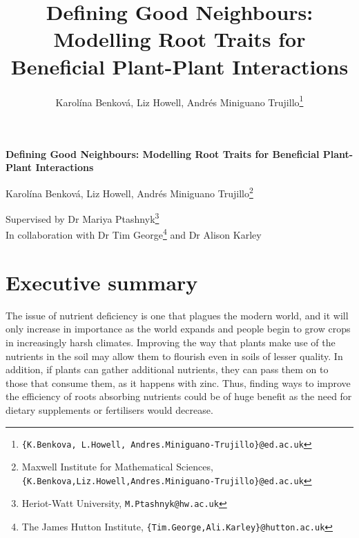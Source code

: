 \documentclass[11pt]{article}
\title{\bf
    \Large
    Defining Good Neighbours: Modelling Root Traits for Beneficial Plant-Plant Interactions
}
\author{
    Karolína Benková, Liz Howell, Andrés Miniguano Trujillo\footnote{ \texttt{\{K.Benkova, L.Howell, Andres.Miniguano-Trujillo\}@ed.ac.uk} }
}
\date{}
\numberwithin{equation}{section}
\begin{document}
\begin{titlepage}
    \begin{center}
        \vspace*{2cm}
        
        \Huge
        \textbf{Defining Good Neighbours: Modelling Root Traits for Beneficial Plant-Plant Interactions}
        
            
        \vspace{1cm}
        
        \Large Karolína Benková, Liz Howell, Andrés Miniguano Trujillo\footnote{\small Maxwell Institute for Mathematical Sciences,   \texttt{\{K.Benkova,Liz.Howell,Andres.Miniguano-Trujillo\}@ed.ac.uk}}
        
            
        \vspace{1.5cm}
            
        \Large
        Supervised by Dr Mariya Ptashnyk\footnote{\small Heriot-Watt University, \texttt{M.Ptashnyk@hw.ac.uk}} \\ 
        In collaboration with Dr Tim George\footnote{\small The James Hutton Institute, \texttt{\{Tim.George,Ali.Karley\}@hutton.ac.uk}} and Dr Alison Karley\textsuperscript{\small\ddag}

        \vfill
            
        
    \end{center}
\end{titlepage}
\newpage
{}

\section*{Executive summary}
\singlespacing

The issue of nutrient deficiency is one that plagues the modern world, and it will only increase in importance as the world expands and people begin to grow crops in increasingly harsh climates. 
Improving the way that plants make use of the nutrients in the soil may allow them to flourish even in soils of lesser quality. In addition, if plants can gather additional nutrients, they can pass them on to those that consume them, as it happens with zinc. Thus, finding ways to improve the efficiency of roots absorbing nutrients could be of huge benefit as the need for dietary supplements or fertilisers would decrease.
\end{document}
